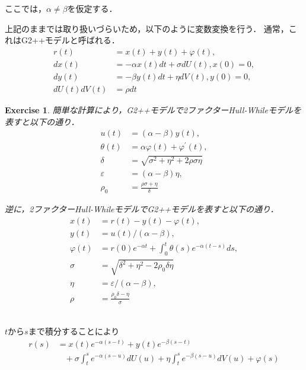 \documentclass[11pt,a4paper]{jsarticle}
\newtheorem{exercise}{Exercise}[section]
\begin{document}
ここでは，$\alpha \neq \beta$を仮定する．

上記のままでは取り扱いづらいため，以下のように変数変換を行う．
通常，これはG2++モデルと呼ばれる．
\begin{align}
r(t)
& =
x(t) + y(t) + \varphi(t), \nonumber \\
dx(t)
& =
-\alpha x(t) dt + \sigma dU(t), x(0) = 0, \nonumber \\
dy(t)
& =
-\beta y(t) dt + \eta dV(t), y(0) = 0, \nonumber \\
dU(t) dV(t)
& =
\rho dt \nonumber
\end{align}

\hrulefill
\begin{exercise}
簡単な計算により，G2++モデルで2ファクターHull-Whileモデルを表すと以下の通り．
\begin{align}
u(t)
& =
(\alpha - \beta) y(t), \nonumber \\
\theta(t)
& =
\alpha \varphi(t) + \varphi^{\prime}(t), \nonumber \\
\delta
& =
\sqrt{\sigma^2 + \eta^2 + 2 \rho \sigma \eta} \nonumber \\
\varepsilon
& =
(\alpha - \beta) \eta, \nonumber \\
\rho_0
& =
\frac{\rho \sigma + \eta}{\delta} \nonumber
\end{align}

逆に，2ファクターHull-WhileモデルでG2++モデルを表すと以下の通り．
\begin{align}
x(t)
& =
r(t) - y(t) - \varphi(t), \nonumber \\
y(t)
& =
u(t) / (\alpha - \beta), \nonumber \\
\varphi(t)
& =
r(0) e^{-\alpha t} + \int_0^t \theta(s) e^{-\alpha (t - s)} ds, \nonumber \\
\sigma
& =
\sqrt{\delta^2 + \eta^2 - 2 \rho_0 \delta \eta} \nonumber \\
\eta
& =
\varepsilon / (\alpha - \beta), \nonumber \\
\rho
& =
\frac{\rho_0 \delta - \eta}{\sigma} \nonumber
\end{align}
\end{exercise}
\hrulefill \\

$t$から$s$まで積分することにより
\begin{align}
r(s)
& =
x(t) e^{-\alpha (s - t)} + y(t) e^{-\beta (s - t)} \nonumber \\
& \hspace{10pt}
+ \sigma \int_t^s e^{-\alpha (s - u)} d U(u) + \eta \int_t^s e^{-\beta (s - u)} d V(u)
+ \varphi(s) \nonumber
\end{align}
\end{document}
